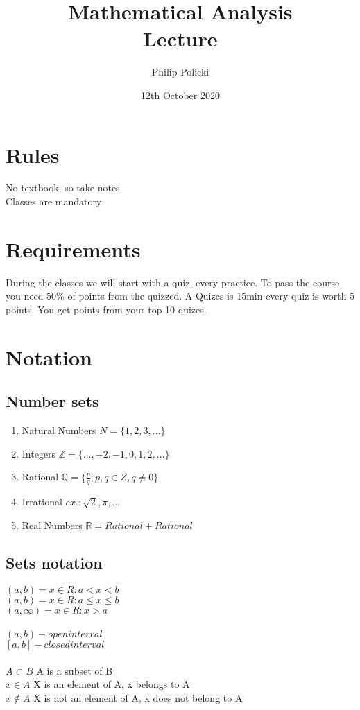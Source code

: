 \documentclass{article}
\title{Mathematical Analysis \\ Lecture }
\author{Philip Policki}
\date{12th October 2020}
\begin{document}
\maketitle
\section{Rules}
	No textbook, so take notes. \\
	Classes are mandatory
	
\section{Requirements}
	During the classes we will start with a quiz, every practice.
	To pass the course you need $50\%$ of points from the quizzed. A Quizes is 15min every quiz is worth 5 points. You get points from your top 10 quizes.
\section{Notation}
\subsection{Number sets}
\begin{enumerate}
	\item Natural Numbers $ N = \{1, 2, 3, ...\}$ 
	\item Integers $ \mathbb{Z} = \{..., -2, -1, 0, 1, 2, ...\}$
	\item Rational $ \mathbb{Q} = \{ \frac{p}{q}; p, q \in Z, q\neq0 \} $
	\item Irrational $ ex.: \sqrt{2}, \pi, ... $ 
	\item Real Numbers $\mathbb{R} = Rational + Rational $
\end{enumerate}

\subsection{Sets notation}
$(a, b) = x \in R: a<x<b$ \\
$(a, b) = x \in R: a \leq x \leq b$ \\	
$(a, \infty) = x\in R: x > a$ \\ \\
$(a, b) - open interval$ \\
$ [a, b] - closed interval $ \\ \\
$ A \subset B$ A is a subset of B \\
$ x\in A$ X is an element of A, x belongs to A \\
$ x\notin A$ X is not an element of A, x does not belong to A \\
\end{document}
